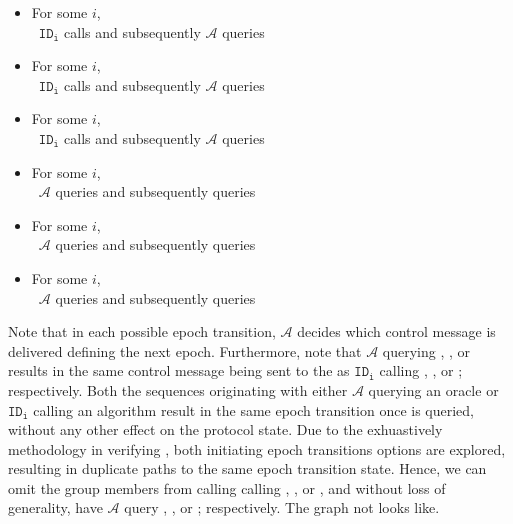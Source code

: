 \begin{itemize}
  \item For some \(i\),\\~\hspace{4em}\(\mathtt{ID_i}\) calls  and subsequently \(\mathcal{A}\) queries 
  \item For some \(i\),\\~\hspace{4em}\(\mathtt{ID_i}\) calls  and subsequently \(\mathcal{A}\) queries 
  \item For some \(i\),\\~\hspace{4em}\(\mathtt{ID_i}\) calls  and subsequently \(\mathcal{A}\) queries 
  \item For some \(i\),\\~\hspace{4em}\(\mathcal{A}\) queries     and subsequently queries 
  \item For some \(i\),\\~\hspace{4em}\(\mathcal{A}\) queries  and subsequently queries 
  \item For some \(i\),\\~\hspace{4em}\(\mathcal{A}\) queries  and subsequently queries 
\end{itemize}

Note that in each possible epoch transition, \(\mathcal{A}\) decides which control message is delivered defining the next epoch.
Furthermore, note that \(\mathcal{A}\) querying , , or  results in the same control message being sent to the  as \(\mathtt{ID_i}\) calling , , or ; respectively.
Both the sequences originating with either \(\mathcal{A}\) querying an oracle or \(\mathtt{ID_i}\) calling an algorithm result in the same epoch transition once  is queried, without any other effect on the protocol state.
Due to the exhuastively methodology in verifying , both initiating epoch transitions options are explored, resulting in duplicate paths to the same epoch transition state.
Hence, we can omit the group members from calling calling , , or , and without loss of generality, have \(\mathcal{A}\) query , , or ; respectively.
The graph not looks like.


